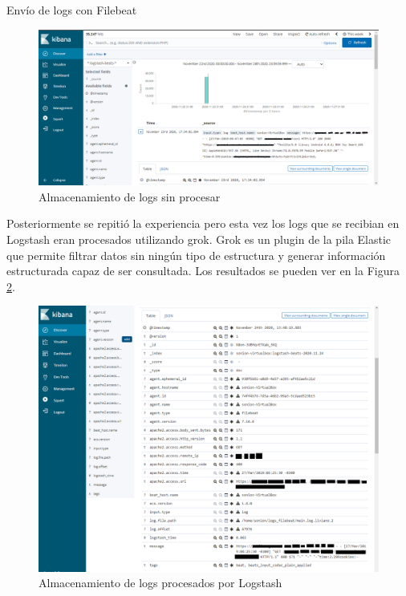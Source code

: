 \begin{section}{Envío de logs con Filebeat}
\begin{figure}[H]
    \centering
        \includegraphics[width=1\textwidth]{./iteracion_2_imagenes/1_kibana_logs_1EDITADA.png}
        \caption{Almacenamiento de logs sin procesar}
        \label{fig:iter2_logs_crudos}
    \end{figure}
    \FloatBarrier
    Posteriormente se repitió la experiencia pero esta vez los logs que se recibian en Logstash eran procesados utilizando grok. Grok es un plugin de la pila Elastic que permite filtrar datos sin ningún tipo de estructura y generar información estructurada capaz de ser consultada.
    Los resultados se pueden ver en la Figura \ref{fig:iter2_logs_filtrados}.\par
    \begin{figure}[H]
    \centering
        \includegraphics[width=1\textwidth]{./iteracion_2_imagenes/kibana_logs_parseados_2EDITADO.png}
        \caption{Almacenamiento de logs procesados por Logstash}
        \label{fig:iter2_logs_filtrados}
    \end{figure}

\end{section}
